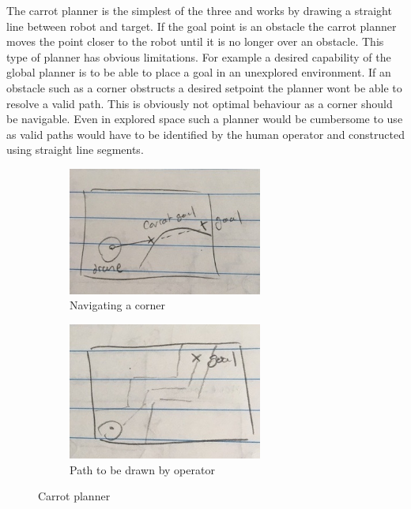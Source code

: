 \documentclass[capstone_report.tex]{subfiles}
\begin{document}
The carrot planner is the simplest of the three and works by drawing a straight line between robot and target.  If the goal point is an obstacle the carrot planner moves the point closer to the robot until it is no longer over an obstacle.  This type of planner has obvious limitations.  For example a desired capability of the global planner is to be able to place a goal in an unexplored environment.  If an obstacle such as a corner obstructs a desired setpoint the planner wont be able to resolve a valid path.  This is obviously not optimal behaviour as a corner should be navigable.  Even in explored space such a planner would be cumbersome to use as valid paths would have to be identified by the human operator and constructed using straight line segments.

\begin{figure}[H]
    \centering
    \begin{subfigure}{.5\textwidth}
        \centering
        \includegraphics[width=0.7\textwidth]{imgs/carrot_planner_a.jpg}
        \caption{Navigating a corner}
    \end{subfigure}%
    \begin{subfigure}{.5\textwidth}
        \centering
        \includegraphics[width=0.7\textwidth]{imgs/carrot_planner_b.jpg}
        \caption{Path to be drawn by operator}
    \end{subfigure}
    \caption{Carrot planner\label{fig:carrot}}
\end{figure}
\end{document}
